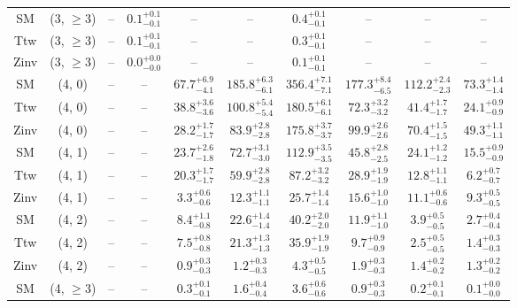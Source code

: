 \begin{table}[h!]
{\begin{tabular}{cccccccccc}
	SM & (3, $\ge3$) & -- & $0.1^{+ 0.1 }_{- 0.1 }$ & -- & -- & $0.4^{+ 0.1 }_{- 0.1 }$ & -- & -- & -- \\[0.5ex] 
	Ttw & (3, $\ge3$) & -- & $0.1^{+ 0.1 }_{- 0.1 }$ & -- & -- & $0.3^{+ 0.1 }_{- 0.1 }$ & -- & -- & -- \\[0.5ex] 
	Zinv & (3, $\ge3$) & -- & $0.0^{+ 0.0 }_{- 0.0 }$ & -- & -- & $0.1^{+ 0.1 }_{- 0.1 }$ & -- & -- & -- \\[0.5ex] 
	SM & (4, 0) & -- & -- & $67.7^{+ 6.9 }_{- 4.1 }$ & $185.8^{+ 6.3 }_{- 6.1 }$ & $356.4^{+ 7.1 }_{- 7.1 }$ & $177.3^{+ 8.4 }_{- 6.5 }$ & $112.2^{+ 2.4 }_{- 2.3 }$ & $73.3^{+ 1.4 }_{- 1.4 }$ \\[0.5ex] 
	Ttw & (4, 0) & -- & -- & $38.8^{+ 3.6 }_{- 3.6 }$ & $100.8^{+ 5.4 }_{- 5.4 }$ & $180.5^{+ 6.1 }_{- 6.1 }$ & $72.3^{+ 3.2 }_{- 3.2 }$ & $41.4^{+ 1.7 }_{- 1.7 }$ & $24.1^{+ 0.9 }_{- 0.9 }$ \\[0.5ex] 
	Zinv & (4, 0) & -- & -- & $28.2^{+ 1.7 }_{- 1.7 }$ & $83.9^{+ 2.8 }_{- 2.8 }$ & $175.8^{+ 3.7 }_{- 3.7 }$ & $99.9^{+ 2.6 }_{- 2.6 }$ & $70.4^{+ 1.5 }_{- 1.5 }$ & $49.3^{+ 1.1 }_{- 1.1 }$ \\[0.5ex] 
	SM & (4, 1) & -- & -- & $23.7^{+ 2.6 }_{- 1.8 }$ & $72.7^{+ 3.1 }_{- 3.0 }$ & $112.9^{+ 3.5 }_{- 3.5 }$ & $45.8^{+ 2.8 }_{- 2.5 }$ & $24.1^{+ 1.2 }_{- 1.2 }$ & $15.5^{+ 0.9 }_{- 0.9 }$ \\[0.5ex] 
	Ttw & (4, 1) & -- & -- & $20.3^{+ 1.7 }_{- 1.7 }$ & $59.9^{+ 2.8 }_{- 2.8 }$ & $87.2^{+ 3.2 }_{- 3.2 }$ & $28.9^{+ 1.9 }_{- 1.9 }$ & $12.8^{+ 1.1 }_{- 1.1 }$ & $6.2^{+ 0.7 }_{- 0.7 }$ \\[0.5ex] 
	Zinv & (4, 1) & -- & -- & $3.3^{+ 0.6 }_{- 0.6 }$ & $12.3^{+ 1.1 }_{- 1.1 }$ & $25.7^{+ 1.4 }_{- 1.4 }$ & $15.6^{+ 1.0 }_{- 1.0 }$ & $11.1^{+ 0.6 }_{- 0.6 }$ & $9.3^{+ 0.5 }_{- 0.5 }$ \\[0.5ex] 
	SM & (4, 2) & -- & -- & $8.4^{+ 1.1 }_{- 0.8 }$ & $22.6^{+ 1.4 }_{- 1.4 }$ & $40.2^{+ 2.0 }_{- 2.0 }$ & $11.9^{+ 1.1 }_{- 1.0 }$ & $3.9^{+ 0.5 }_{- 0.5 }$ & $2.7^{+ 0.4 }_{- 0.4 }$ \\[0.5ex] 
	Ttw & (4, 2) & -- & -- & $7.5^{+ 0.8 }_{- 0.8 }$ & $21.3^{+ 1.3 }_{- 1.3 }$ & $35.9^{+ 1.9 }_{- 1.9 }$ & $9.7^{+ 0.9 }_{- 0.9 }$ & $2.5^{+ 0.5 }_{- 0.5 }$ & $1.4^{+ 0.3 }_{- 0.3 }$ \\[0.5ex] 
	Zinv & (4, 2) & -- & -- & $0.9^{+ 0.3 }_{- 0.3 }$ & $1.2^{+ 0.3 }_{- 0.3 }$ & $4.3^{+ 0.5 }_{- 0.5 }$ & $1.9^{+ 0.3 }_{- 0.3 }$ & $1.4^{+ 0.2 }_{- 0.2 }$ & $1.3^{+ 0.2 }_{- 0.2 }$ \\[0.5ex] 
	SM & (4, $\ge3$) & -- & -- & $0.3^{+ 0.1 }_{- 0.1 }$ & $1.6^{+ 0.4 }_{- 0.4 }$ & $3.6^{+ 0.6 }_{- 0.6 }$ & $0.9^{+ 0.3 }_{- 0.3 }$ & $0.2^{+ 0.1 }_{- 0.1 }$ & $0.1^{+ 0.0 }_{- 0.0 }$ \\[0.5ex] 

\end{tabular}}
\end{table}
